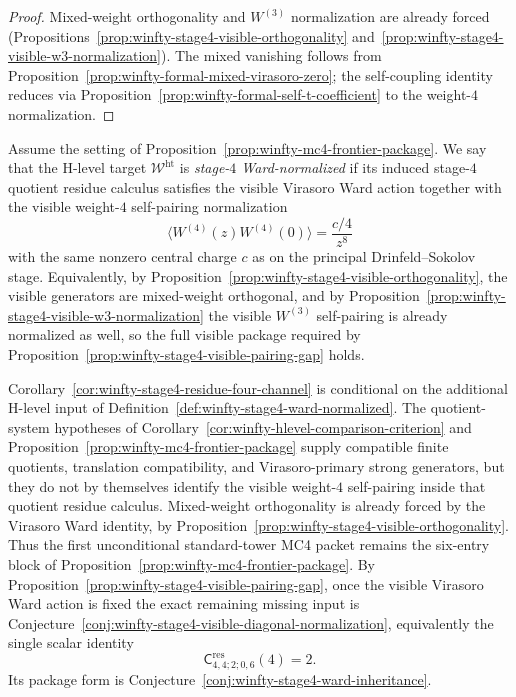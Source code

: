 \begin{proof}
Mixed-weight orthogonality and $W^{(3)}$ normalization are already forced (Propositions~\ref{prop:winfty-stage4-visible-orthogonality} and~\ref{prop:winfty-stage4-visible-w3-normalization}).  The mixed vanishing follows from Proposition~\ref{prop:winfty-formal-mixed-virasoro-zero}; the self-coupling identity reduces via Proposition~\ref{prop:winfty-formal-self-t-coefficient} to the weight-$4$ normalization.
\end{proof}

\begin{definition}
\label{def:winfty-stage4-ward-normalized}
Assume the setting of
Proposition~\ref{prop:winfty-mc4-frontier-package}.  We say that the
H-level target $\mathcal{W}^{\mathrm{ht}}$ is
\emph{stage-$4$ Ward-normalized} if its induced stage-$4$ quotient
residue calculus satisfies the visible Virasoro Ward action together
with the visible weight-$4$ self-pairing normalization
\[
\langle W^{(4)}(z)W^{(4)}(0)\rangle=\frac{c/4}{z^{8}}
\]
with the same nonzero central charge $c$ as on the principal
Drinfeld--Sokolov stage.  Equivalently, by
Proposition~\ref{prop:winfty-stage4-visible-orthogonality}, the
visible generators are mixed-weight orthogonal, and by
Proposition~\ref{prop:winfty-stage4-visible-w3-normalization} the
visible $W^{(3)}$ self-pairing is already normalized as well, so the
full visible package required by
Proposition~\ref{prop:winfty-stage4-visible-pairing-gap} holds.
\end{definition}

\begin{remark}
\label{rem:winfty-stage4-four-channel-gap}
Corollary~\ref{cor:winfty-stage4-residue-four-channel} is conditional
on the additional H-level input of
Definition~\ref{def:winfty-stage4-ward-normalized}.  The
quotient-system hypotheses of
Corollary~\ref{cor:winfty-hlevel-comparison-criterion} and
Proposition~\ref{prop:winfty-mc4-frontier-package} supply compatible
finite quotients, translation compatibility, and Virasoro-primary
strong generators, but they do not by themselves identify the
visible weight-$4$ self-pairing inside that quotient residue calculus.
Mixed-weight orthogonality is already forced by the Virasoro Ward
identity, by
Proposition~\ref{prop:winfty-stage4-visible-orthogonality}.  Thus the
first unconditional standard-tower
MC4 packet remains the six-entry block of
Proposition~\ref{prop:winfty-mc4-frontier-package}.  By
Proposition~\ref{prop:winfty-stage4-visible-pairing-gap}, once the
visible Virasoro Ward action is fixed the exact remaining missing input
is Conjecture~\ref{conj:winfty-stage4-visible-diagonal-normalization},
equivalently the single scalar identity
\[
\mathsf{C}^{\mathrm{res}}_{4,4;2;0,6}(4)=2.
\]
Its package form is
Conjecture~\ref{conj:winfty-stage4-ward-inheritance}.
\end{remark}

